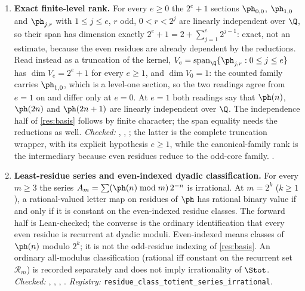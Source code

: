 {\begin{enumerate}[label=\textbf{R\arabic*.},ref=R\arabic*,leftmargin=2.4em,
  itemsep=0.2em,topsep=0.25em]
\item\label{res:rank} 
\textbf{Exact finite-level rank.}  For every $e\ge0$ the $2^e+1$ sections
$\ph_{0,0}$, $\ph_{1,0}$ and $\ph_{j,r}$ with $1\le j\le e$, $r$ odd,
$0<r<2^j$ are linearly independent over $\Q$, so their span has dimension
exactly $2^e+1=2+\sum_{j=1}^{e}2^{j-1}$: exact, not an estimate, because the
even residues are already dependent by the reductions.  Read instead as a
truncation of the kernel, $V_e=\operatorname{span}_{\Q}\{\ph_{j,r}:0\le j\le
e\}$ has $\dim V_e=2^e+1$ for every $e\ge1$, and $\dim V_0=1$: the counted
family carries $\ph_{1,0}$, which is a level-one section, so the two readings
agree from $e=1$ on and differ only at $e=0$.  At $e=1$ both readings say that
$\ph(n)$, $\ph(2n)$ and $\ph(2n+1)$ are linearly independent over $\Q$.  The
independence half of
\ref{res:basis} follows by finite character; the span equality needs the
reductions as well.
{\footnotesize\emph{Checked:}
,
,
;
the latter is the complete truncation wrapper, with its explicit hypothesis $e\ge1$,
while the canonical-family rank is the intermediary because even residues reduce to
the odd-core family.
.}

\item\label{res:residueseries} 
\textbf{Least-residue series and even-indexed dyadic classification.}
For every $m\ge3$ the series $A_m=\sum(\ph(n)\bmod m)\,2^{-n}$ is
irrational.  At $m=2^k$ ($k\ge1$), a rational-valued letter map on residues
of $\ph$ has rational binary value if and only if it is constant on the
even-indexed residue classes.  The forward half is Lean-checked; the converse
is the ordinary identification that every even residue is recurrent at dyadic
moduli.  Even-indexed means classes of $\ph(n)$ modulo $2^k$; it is not the
odd-residue indexing of \ref{res:basis}.  An ordinary all-modulus
classification (rational iff constant on the recurrent set $\mathcal R_m$)
is recorded separately and does not imply irrationality of $\Stot$.
{\footnotesize\emph{Checked:}
,
,
,
.
\emph{Registry:} \texttt{residue\_class\_totient\_series\_irrational}.}


\end{enumerate}}
